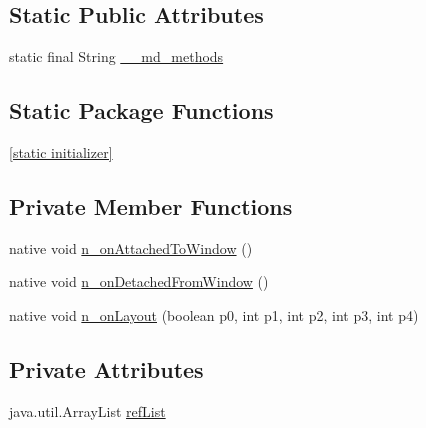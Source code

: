 \subsection*{Static Public Attributes}
\begin{CompactItemize}
\item 
static final String \hyperlink{classmd5b60ffeb829f638581ab2bb9b1a7f4f3f_1_1_navigation_renderer_6f16e4bf9cbed6430832e41a4d1bd118}{\_\-\_\-md\_\-methods}
\end{CompactItemize}
\subsection*{Static Package Functions}
\begin{CompactItemize}
\item 
\hyperlink{classmd5b60ffeb829f638581ab2bb9b1a7f4f3f_1_1_navigation_renderer_f4da07bbbf2b14778d4eadfa5dd3c744}{\mbox{[}static initializer\mbox{]}}
\end{CompactItemize}
\subsection*{Private Member Functions}
\begin{CompactItemize}
\item 
native void \hyperlink{classmd5b60ffeb829f638581ab2bb9b1a7f4f3f_1_1_navigation_renderer_77794e91c573098800a84c804674bdd5}{n\_\-onAttachedToWindow} ()
\item 
native void \hyperlink{classmd5b60ffeb829f638581ab2bb9b1a7f4f3f_1_1_navigation_renderer_aae9bf07ad0aa59b17ac51722f2d0f2c}{n\_\-onDetachedFromWindow} ()
\item 
native void \hyperlink{classmd5b60ffeb829f638581ab2bb9b1a7f4f3f_1_1_navigation_renderer_af33a2356cdc5ae5ab47a5c443433d3b}{n\_\-onLayout} (boolean p0, int p1, int p2, int p3, int p4)
\end{CompactItemize}
\subsection*{Private Attributes}
\begin{CompactItemize}
\item 
java.util.ArrayList \hyperlink{classmd5b60ffeb829f638581ab2bb9b1a7f4f3f_1_1_navigation_renderer_34e14358e96ac8045a51c49c123a8e3e}{refList}
\end{CompactItemize}



